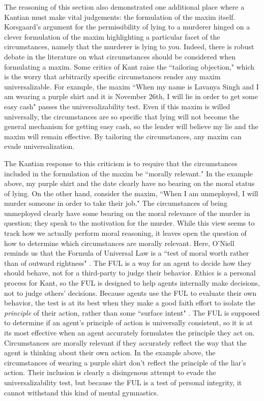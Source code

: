 \begin{isabellebody}
\begin{isamarkuptext}
The reasoning of this section also demonstrated one additional place where a Kantian must make vital judgements:
the formulation of the maxim itself. Korsgaard's argument for the permissibility of lying to a 
murderer hinged on a clever formulation of the maxim highlighting a particular facet of the circumstances, 
namely that the murderer is lying to you. Indeed, there is robust debate in the literature on what
circumstances should be considered when formulating a maxim. Some critics of Kant raise the ``tailoring
objection," which is the worry that arbitrarily specific circumstances render any maxim universalizable. For 
example, the maxim ``When my name is Lavanya Singh and I am wearing a purple shirt and it is November 26th, 
I will lie in order to get some easy cash" passes the universalizability test. Even if this maxim is 
willed universally, the circumstances are so specific that lying will not become the general mechanism
for getting easy cash, so the lender will believe my lie and the maxim will remain effective. By tailoring
the circumstances, any maxim can evade universalization.

The Kantian response to this criticism is to require that the circumstances included in the formulation
of the maxim be ``morally relevant." In the example above, my purple shirt and the date clearly have no bearing on 
the moral status of lying. On the other hand, consider the maxim, ``When I am unmeployed, I will murder
someone in order to take their job." The circumstances of being unmeployed clearly have some bearing on the moral
relevance of the murder in question; they speak to the motivation for the murder. While this view seems 
to track how we actually perform moral reasoning, it leaves open the question of how to determine
which circumstances are morally relevant. Here, O'Niell reminds us that the Formula of Universal Law is 
a ``test of moral worth rather than of outward rightness" \citep[98]{constofreason}. The FUL is a way 
for an agent to decide how they should behave, not for a third-party to judge their behavior. Ethics is 
a personal process for Kant, so the FUL is designed to help agents internally make decisions, not to 
judge others' decisions. Because agents use the FUL to evaluate their own behavior, the test is at its 
best when they make a good faith effort to isolate the \emph{principle} of their action, rather than some
``surface intent" \citep[87]{constofreason}. The FUL is supposed to determine if an agent's principle of action
is universally consistent, so it is at its most effective when an agent accurately formulates the principle
they act on. Circumstances are morally relevant if they accurately reflect the way that the agent is 
thinking about their own action. In the example above, the circumstances of wearing a purple shirt don't reflect
the principle of the liar's action. Their inclusion is clearly a disingenous attempt to evade the universalizability
test, but because the FUL is a test of personal integrity, it cannot withstand this kind of mental
gymnastics.


\end{isamarkuptext}
\end{isabellebody}
